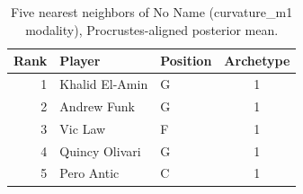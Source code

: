 \begin{table}[htbp]
  \centering\small
  \begin{tabular}{rllc}
    \toprule
    Rank & Player & Position & Archetype \\
    \midrule
    1 & Khalid El-Amin & G & 1 \\
    2 & Andrew Funk & G & 1 \\
    3 & Vic Law & F & 1 \\
    4 & Quincy Olivari & G & 1 \\
    5 & Pero Antic & C & 1 \\
    \bottomrule
  \end{tabular}
  \caption{Five nearest neighbors of No Name (curvature_m1 modality), Procrustes-aligned posterior mean.}
  \label{tab:No_Name_neighbors_curvature_m1}
\end{table}

